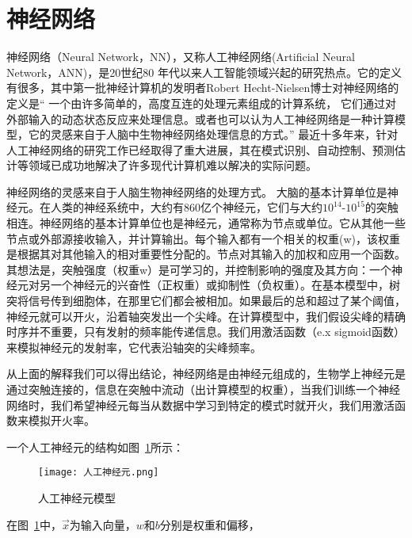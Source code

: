 \section{神经网络}
神经网络（Neural Network，NN），又称人工神经网络(Artificial Neural Network，ANN)，是20世纪80 年代以来人工智能领域兴起的研究热点。它的定义有很多，其中第一批神经计算机的发明者Robert Hecht-Nielsen博士对神经网络的定义是“ 一个由许多简单的，高度互连的处理元素组成的计算系统， 它们通过对外部输入的动态状态反应来处理信息。或者也可以认为人工神经网络是一种计算模型，它的灵感来自于人脑中生物神经网络处理信息的方式。”
最近十多年来，针对人工神经网络的研究工作已经取得了重大进展，其在模式识别、自动控制、预测估计等领域已成功地解决了许多现代计算机难以解决的实际问题。


神经网络的灵感来自于人脑生物神经网络的处理方式。
大脑的基本计算单位是神经元。在人类的神经系统中，大约有860亿个神经元，它们与大约$10^{14}$-$10^{15}$的突触相连。神经网络的基本计算单位也是神经元，通常称为节点或单位。它从其他一些节点或外部源接收输入，并计算输出。每个输入都有一个相关的权重(w)，该权重是根据其对其他输入的相对重要性分配的。节点对其输入的加权和应用一个函数。
其想法是，突触强度（权重w）是可学习的，并控制影响的强度及其方向：一个神经元对另一个神经元的兴奋性（正权重）或抑制性（负权重）。在基本模型中，树突将信号传到细胞体，在那里它们都会被相加。如果最后的总和超过了某个阈值，神经元就可以开火，沿着轴突发出一个尖峰。在计算模型中，我们假设尖峰的精确时序并不重要，只有发射的频率能传递信息。我们用激活函数（e.x sigmoid函数）来模拟神经元的发射率，它代表沿轴突的尖峰频率。

从上面的解释我们可以得出结论，神经网络是由神经元组成的，生物学上神经元是通过突触连接的，信息在突触中流动（出计算模型的权重），当我们训练一个神经网络时，我们希望神经元每当从数据中学习到特定的模式时就开火，我们用激活函数来模拟开火率。

一个人工神经元的结构如图~\ref{fig:神经元}所示：
\begin{figure}
    \centering
    \texttt{[image: 人工神经元.png]}
    \caption{人工神经元模型}
    \label{fig:神经元}
  \end{figure}

在图~\ref{fig:神经元}中，$\vec{x}$为输入向量，$w$和$b$分别是权重和偏移，

